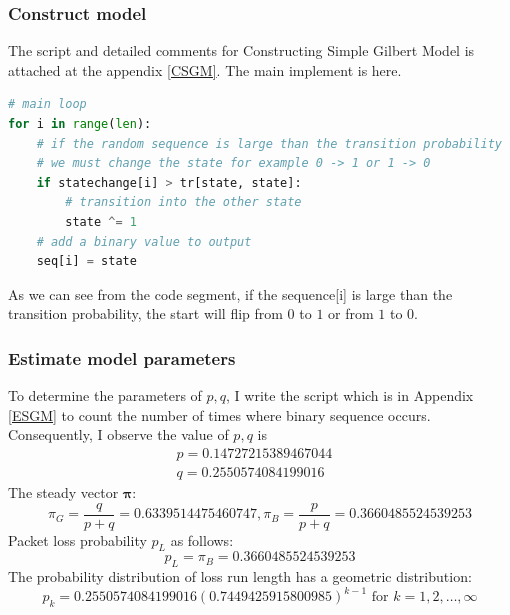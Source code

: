 \documentclass[11pt]{article}
\begin{document}
\subsubsection{Construct model}
The script and detailed comments for Constructing Simple Gilbert Model is attached at the appendix \ref{CSGM}.
The main implement is here.
\begin{lstlisting}[language=Python]
# main loop
for i in range(len):
    # if the random sequence is large than the transition probability
    # we must change the state for example 0 -> 1 or 1 -> 0
    if statechange[i] > tr[state, state]:
        # transition into the other state
        state ^= 1
    # add a binary value to output
    seq[i] = state
\end{lstlisting}
As we can see from the code segment, if the sequence[i] is large than the transition probability, the start will flip from $0$ to $1$ or from $1$ to $0$.
\subsubsection{Estimate model parameters}
To determine the parameters of $p,q$, I write the script which is in Appendix \ref{ESGM} to count the number of times where binary sequence occurs.
Consequently, I observe the value of $p,q$ is 
\begin{equation}
    \begin{array}{lr}
    p = 0.14727215389467044 & \\
    q = 0.2550574084199016
    \end{array}
\end{equation}
The steady vector $\boldsymbol{\pi}$:
\begin{equation}
    \pi_G = \frac{q}{p+q} = 0.6339514475460747, \pi_B = \frac{p}{p+q} = 0.3660485524539253
\end{equation}
Packet loss probability $p_L$ as follows:
\begin{equation}
    p_L = \pi_B = 0.3660485524539253
\end{equation}
The probability distribution of loss run length has a geometric distribution:
\begin{equation}
    p_{k} =0.2550574084199016(0.7449425915800985)^{k-1} \text { for } k=1,2, \ldots, \infty \label{distributionofSGM}
\end{equation}
\end{document}
